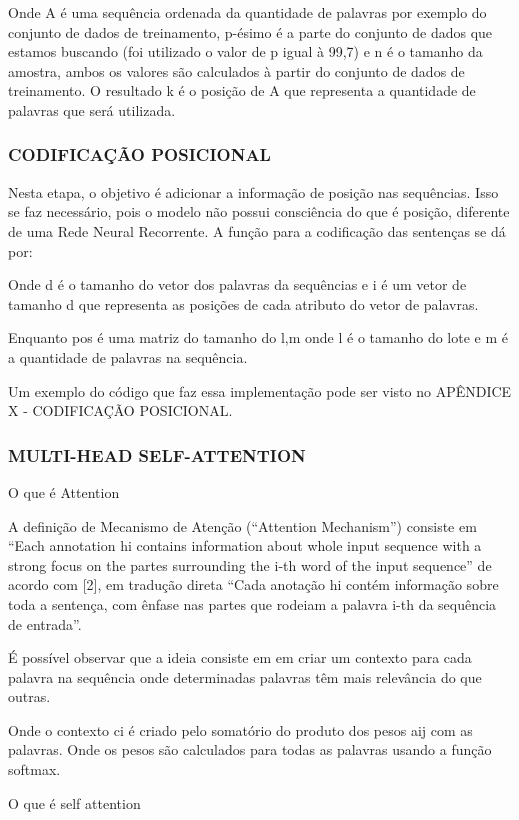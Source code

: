 Onde A é uma sequência ordenada da quantidade de palavras por exemplo do conjunto de dados de treinamento,  p-ésimo é a parte  do conjunto de dados que estamos buscando (foi utilizado o valor de p igual à 99,7) e n é o tamanho da amostra, ambos os valores são calculados à partir do conjunto de dados de treinamento. O resultado k é o posição de A que representa a quantidade de palavras que será utilizada.

\subsubsection{CODIFICAÇÃO POSICIONAL}

Nesta etapa, o objetivo é adicionar a informação de posição nas sequências. Isso se faz necessário, pois o modelo não possui consciência do que é posição, diferente de uma Rede Neural Recorrente. A função para a codificação das sentenças se dá por:

Onde d é o tamanho do vetor dos palavras da sequências e i é um vetor de tamanho d que representa as posições de cada atributo do vetor de palavras.

Enquanto pos é uma matriz do tamanho do l,m onde l é o tamanho do lote e m é a quantidade de palavras na sequência.

Um exemplo do código que faz essa implementação pode ser visto no APÊNDICE X - CODIFICAÇÃO POSICIONAL.

\subsubsection{MULTI-HEAD SELF-ATTENTION}
O que é Attention

A definição de Mecanismo de Atenção (“Attention Mechanism”) consiste em “Each annotation hi contains information about whole input sequence with a strong focus on the partes surrounding the i-th word of the input sequence” de acordo com [2], em tradução direta “Cada anotação hi contém informação sobre toda a sentença, com ênfase nas partes que rodeiam a palavra i-th da sequência de entrada”.

É possível observar que a ideia consiste em em criar um contexto para cada palavra na sequência onde determinadas palavras têm mais relevância do que outras.

Onde o contexto ci é criado pelo somatório do produto dos pesos aij com as palavras. Onde os pesos são calculados para todas as palavras usando a função softmax.

O que é self attention

